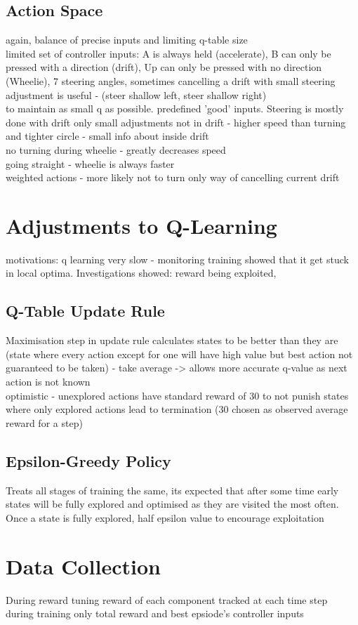 \subsection{Action Space}
again, balance of precise inputs and limiting q-table size
\\limited set of controller inputs: A is always held (accelerate), B can only be pressed with a direction (drift), Up can only be pressed with no direction (Wheelie), 7 steering angles, sometimes cancelling a drift with small steering adjustment is useful - (steer shallow left, steer shallow right)
\\ to maintain as small q as possible. predefined 'good' inputs. Steering is mostly done with drift only small adjustments not in drift - higher speed than turning and tighter circle - small info about inside drift
\\ no turning during wheelie - greatly decreases speed 
\\ going straight - wheelie is always faster
\\ weighted actions - more likely not to turn only way of cancelling current drift

\section{Adjustments to Q-Learning}
motivations: q learning very slow - monitoring training showed that it get stuck in local optima. Investigations showed: reward being exploited, 
\subsection{Q-Table Update Rule}
Maximisation step in update rule calculates states to be better than they are (state where every action except for one will have high value but best action not guaranteed to be taken) - take average -> allows more accurate q-value as next action is not known
\\ optimistic - unexplored actions have standard reward of 30 to not punish states where only explored actions lead to termination (30 chosen as observed average reward for a step)

\subsection{Epsilon-Greedy Policy}
Treats all stages of training the same, its expected that after some time early states will be fully explored and optimised as they are visited the most often. Once a state is fully explored, half epsilon value to encourage exploitation

\section{Data Collection}
During reward tuning reward of each component tracked at each time step
\\ during training only total reward and best epsiode's controller inputs
